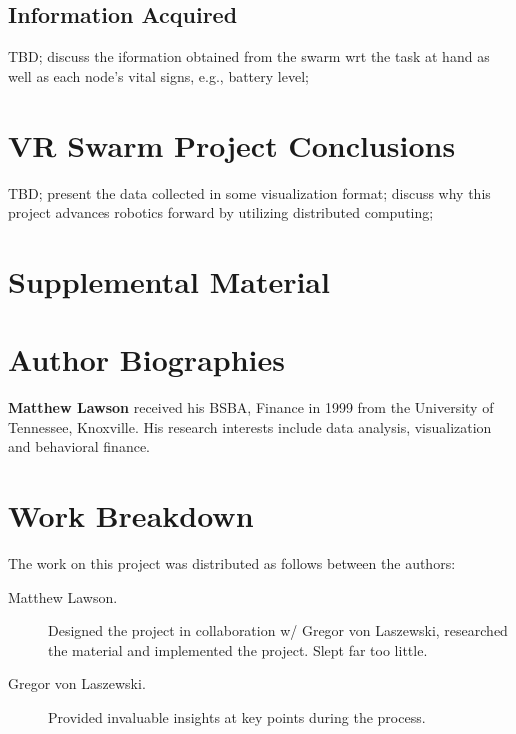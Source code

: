 \documentclass[9pt,twocolumn,twoside]{../../styles/osajnl}
\begin{document}
\subsection{Information Acquired}
TBD; discuss the iformation obtained from the swarm wrt the task at hand as well as each node's vital signs, e.g., battery level;

\section{VR Swarm Project Conclusions}
TBD; present the data collected in some visualization format; discuss why this project advances robotics forward by utilizing distributed computing;

\section{Supplemental Material}



 
\section*{Author Biographies}
\begingroup
\setlength\intextsep{0pt}
\begin{minipage}[t][3.2cm][t]{1.0\columnwidth} %
  \noindent
  {\bfseries Matthew Lawson} received his BSBA, Finance in 1999 from
  the University of Tennessee, Knoxville. His research interests include
  data analysis, visualization and behavioral finance.
\end{minipage}
\endgroup

\appendix

\section{Work Breakdown}

The work on this project was distributed as follows between the
authors:


\begin{description}

\item[Matthew Lawson.] Designed the project in collaboration w/ Gregor von Laszewski, researched the material and implemented the project.  Slept far too little.

\item[Gregor von Laszewski.] Provided invaluable insights at key points during the process.

\end{description}
\end{document}
